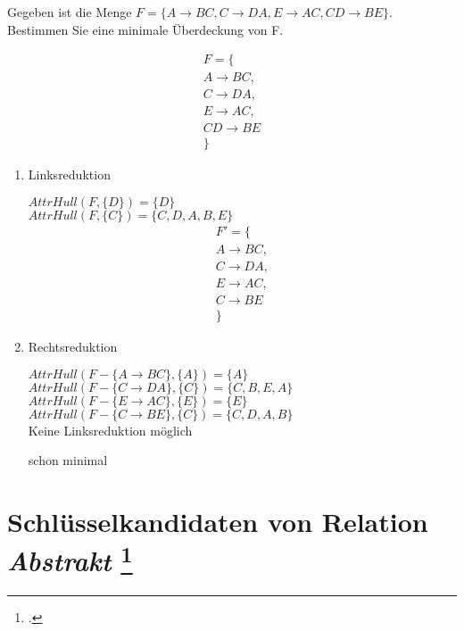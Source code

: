 \documentclass{lehramt-informatik-haupt}
\begin{document}
Gegeben ist die Menge $F = \{A \rightarrow BC, C \rightarrow DA, E
\rightarrow AC, CD \rightarrow BE\}$. Bestimmen Sie eine minimale
Überdeckung von F.

\begin{multline*}
F = \{ \\
  A \rightarrow BC, \\
  C \rightarrow DA, \\
  E \rightarrow AC, \\
  CD \rightarrow BE \\
\}
\end{multline*}

\begin{liAntwort}

\begin{enumerate}
\item Linksreduktion

$AttrHull(F, \{D\}) = \{D\}$ \\
$AttrHull(F, \{C\}) = \{C, D, A, B, E\}$ \\

\begin{multline*}
F' = \{ \\
  A \rightarrow BC, \\
  C \rightarrow DA, \\
  E \rightarrow AC, \\
  C \rightarrow BE \\
\}
\end{multline*}

\item Rechtsreduktion

$AttrHull(F - \{A \rightarrow BC\}, \{A\}) = \{A\}$ \\
$AttrHull(F - \{C \rightarrow DA\}, \{C\}) = \{C, B, E, A\}$ \\
$AttrHull(F - \{E \rightarrow AC\}, \{E\}) = \{E\}$ \\
$AttrHull(F - \{C \rightarrow BE\}, \{C\}) = \{C, D, A, B\}$ \\
Keine Linksreduktion möglich

schon minimal

\end{enumerate}

\end{liAntwort}

%

\section{Schlüsselkandidaten von Relation \emph{Abstrakt}
\footcite[Seite 1, Aufgabe 3]{db:ab:5}
}
\end{document}
